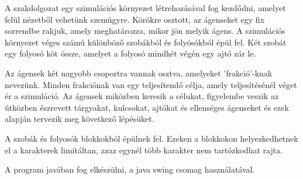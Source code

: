 
A szakdolgozat egy szimulációs környezet létrehozásával fog kezdődni, amelyet felül nézetből vehetünk szemügyre.
Körökre osztott, az ágenseket egy fix sorrendbe rakjuk, amely meghatározza, mikor jön melyik ágens.
A szimulációs környezet véges számú különböző szobákból és folyósókból épül fel. Két szobát egy folyosó köt össze, amelyet a folyosó mindkét végén egy ajtó zár le. 

Az ágensek két nagyobb csoportra vannak osztva, amelyeket 'frakció'-knak nevezünk. Minden frakciónak van egy teljesítendő célja, amely teljesítésénél véget ér a szimuláció.
Az ágensek miközben keresik a célukat, figyelembe veszik az útközben észrevett tárgyakat, kulcsokat, ajtókat és ellenséges ágenseket és ezek alapján tervezik meg következő lépésüket.

A szobák és folyosók blokkokból épülnek fel. Ezeken a blokkokon helyezkedhetnek el a karakterek limitáltan, azaz egynél több karakter nem tartózkodhat rajta.

A program javában \cite{arnold2005java} fog elkészülni, a java swing csomag \cite{10.5555/291162} használatával.